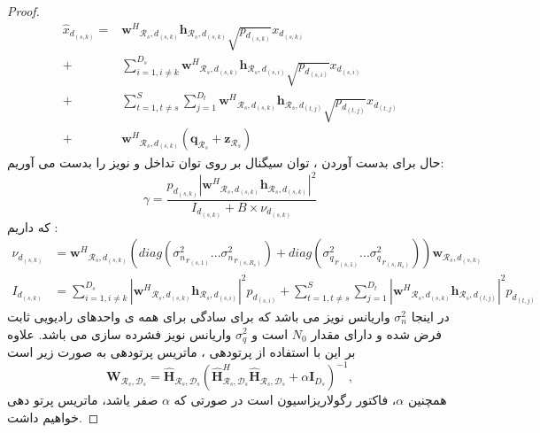 \begin{proof}
\begin{equation}
\begin{split}
\hat{x}_{d_{(s,k)}} = & {\boldsymbol{w}^H}_{\mathcal{R}_s, d_{(s,k)}} \boldsymbol{h}_{\mathcal{R}_s, d_{(s,k)}} \sqrt{p_{d_{(s,k)}}}  x_{d_{(s,k)}} \\
+ & \sum_{i=1,i\neq k}^{D_s}  {\boldsymbol{w}^H}_{\mathcal{R}_s, d_{(s,k)}} \boldsymbol{h}_{\mathcal{R}_s, d_{(s,i)}} \sqrt{p_{d_{(s,i)}}}  x_{d_{(s,i)}} \\
+&  \sum_{t=1,t\neq s}^{S} \sum_{j=1}^{D_t} {\boldsymbol{w}^H}_{\mathcal{R}_s, d_{(s,k)}} \boldsymbol{h}_{\mathcal{R}_s, d_{(t,j)}} \sqrt{p_{d_{(t,j)}}}  x_{d_{(t,j)}} \\
+& {\boldsymbol{w}^H}_{\mathcal{R}_s, d_{(s,k)}}  ({\boldsymbol{q}}_{\mathcal{R}_s} + {\boldsymbol{z}}_{\mathcal{R}_s})
\end{split}
\end{equation}
حال برای بدست آوردن  ، توان سیگنال بر روی توان تداخل و نویز را بدست می آوریم:
\begin{equation}
\gamma = \frac{p_{d_{(s,k)}}|{\boldsymbol{w}^H}_{\mathcal{R}_s, d_{(s,k)}} \boldsymbol{h}_{\mathcal{R}_s, d_{(s,k)}}|^2}{
  I_{d_{(s,k)}}
+ B \times \nu_{d_{(s,k)}}
}
\end{equation}
که داریم :
\begin{equation}
\begin{split}
\nu_{d_{(s,k)}}&  = {\boldsymbol{w}^H}_{\mathcal{R}_s, d_{(s,k)}}  (diag({\sigma_n^2}_{r_{(s,1)}}...{\sigma_n^2}_{r_{(s,R_s)}})+diag({\sigma_q^2}_{r_{(s,1)}}...{\sigma_q^2}_{r_{(s,R_s)}})) {\boldsymbol{w}}_{\mathcal{R}_s, d_{(s,k)}}\\
I_{d_{(s,k)}}& = \sum_{i=1,i\neq k}^{D_s}  |{\boldsymbol{w}^H}_{\mathcal{R}_s, d_{(s,k)}} \boldsymbol{h}_{\mathcal{R}_s, d_{(s,i)}}|^2 p_{d_{(s,i)}} +\sum_{t=1,t\neq s}^{S} \sum_{j=1}^{D_t} |{\boldsymbol{w}^H}_{\mathcal{R}_s, d_{(s,k)}} \boldsymbol{h}_{\mathcal{R}_s, d_{(t,j)}}|^2 p_{d_{(t,j)}} 
\end{split}
\end{equation}
 در اینجا  $\sigma_n^2$ واریانس نویز می باشد که  برای سادگی برای همه ی واحدهای رادیویی ثابت فرض شده و  دارای مقدار $N_0$ 
است و $\sigma_q^2$ واریانس نویز فشرده سازی می باشد.
علاوه بر این با استفاده از پرتودهی ، ماتریس پرتودهی به صورت زیر است 
\begin{equation}
\boldsymbol{W}_{\mathcal{R}_s,\mathcal{D}_s} = \hat{\boldsymbol{H}}_{\mathcal{R}_s,\mathcal{D}_s}(\hat{\boldsymbol{H}}_{\mathcal{R}_s,\mathcal{D}_s}^H \hat{\boldsymbol{H}}_{\mathcal{R}_s,\mathcal{D}_s}+ \alpha \boldsymbol{I}_{{D}_s})^{-1},
\end{equation} 
همچنین  $\alpha$، فاکتور رگولاریزاسیون است در صورتی که $\alpha$ صفر یاشد، ماتریس پرتو دهی  خواهیم داشت.
\end{proof}
